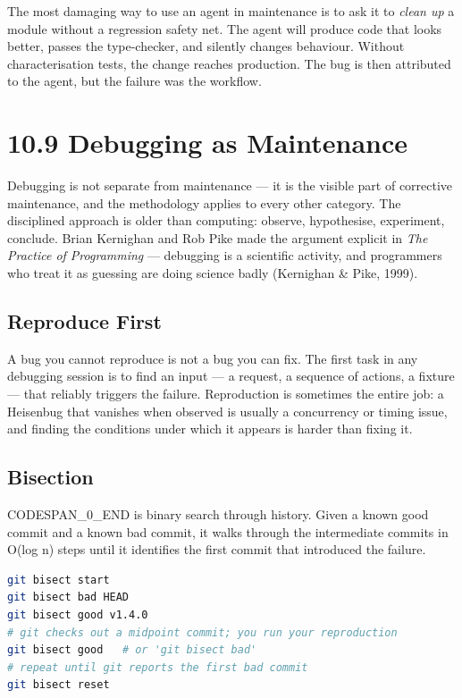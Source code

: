 \documentclass[11pt,a4paper]{book}
\begin{document}
The most damaging way to use an agent in maintenance is to ask it to \textit{clean up} a module without a regression safety net. The agent will produce code that looks better, passes the type-checker, and silently changes behaviour. Without characterisation tests, the change reaches production. The bug is then attributed to the agent, but the failure was the workflow.

\medskip

\section{10.9 Debugging as Maintenance}

Debugging is not separate from maintenance --- it is the visible part of corrective maintenance, and the methodology applies to every other category. The disciplined approach is older than computing: observe, hypothesise, experiment, conclude. Brian Kernighan and Rob Pike made the argument explicit in \textit{The Practice of Programming} --- debugging is a scientific activity, and programmers who treat it as guessing are doing science badly (Kernighan \& Pike, 1999).

\subsection{Reproduce First}

A bug you cannot reproduce is not a bug you can fix. The first task in any debugging session is to find an input --- a request, a sequence of actions, a fixture --- that reliably triggers the failure. Reproduction is sometimes the entire job: a Heisenbug that vanishes when observed is usually a concurrency or timing issue, and finding the conditions under which it appears is harder than fixing it.

\subsection{Bisection}

CODESPAN\_0\_END is binary search through history. Given a known good commit and a known bad commit, it walks through the intermediate commits in O(log n) steps until it identifies the first commit that introduced the failure.

\begin{lstlisting}[language=Bash]
git bisect start
git bisect bad HEAD
git bisect good v1.4.0
# git checks out a midpoint commit; you run your reproduction
git bisect good   # or 'git bisect bad'
# repeat until git reports the first bad commit
git bisect reset
\end{lstlisting}
\end{document}
